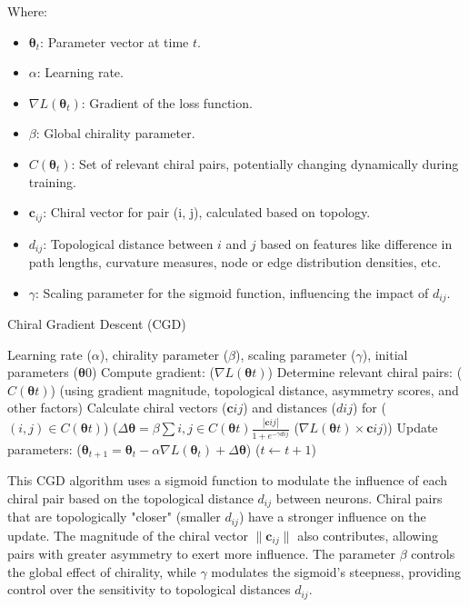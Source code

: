 \documentclass[12pt, a4paper]{article}
\begin{document}
Where:

\begin{itemize}
    \item \(\boldsymbol{\theta}_t\): Parameter vector at time \(t\).
    \item \(\alpha\): Learning rate.
    \item \(\nabla L(\boldsymbol{\theta}_t)\): Gradient of the loss function.
    \item \(\beta\): Global chirality parameter.
    \item \(C(\boldsymbol{\theta}_t)\): Set of relevant chiral pairs, potentially changing dynamically during training.
    \item \(\mathbf{c}_{ij}\): Chiral vector for pair (i, j), calculated based on topology.
    \item \(d_{ij}\): Topological distance between \(i\) and \(j\) based on features like difference in path lengths, curvature measures, node or edge distribution densities, etc.
    \item \(\gamma\): Scaling parameter for the sigmoid function, influencing the impact of \(d_{ij}\).
\end{itemize}

\begin{algorithm}
\caption{Chiral Gradient Descent (CGD)}
\label{alg:cgd}
\begin{algorithmic}
\Require Learning rate ($\alpha$), chirality parameter ($\beta$), scaling parameter ($\gamma$), initial parameters ($\boldsymbol{\theta}0$)
	\State Compute gradient: ($\nabla L(\boldsymbol{\theta}t)$)
	\State Determine relevant chiral pairs: ($C(\boldsymbol{\theta}t)$) (using gradient magnitude, topological distance, asymmetry scores, and other factors)
	\State Calculate chiral vectors ($\mathbf{c}{ij}$) and distances ($d{ij}$) for ($(i, j) \in C(\boldsymbol{\theta}t)$)
	\State ($\Delta \boldsymbol{\theta} = \beta \sum{i,j \in C(\boldsymbol{\theta}t)} \frac{| \mathbf{c}{ij} |}{1 + e^{-\gamma d{ij}}}$ ($\nabla L(\boldsymbol{\theta}t) \times \mathbf{c}{ij})$)
	\State Update parameters: ($\boldsymbol{\theta}_{t+1} = \boldsymbol{\theta}_t - \alpha \nabla L(\boldsymbol{\theta}_t) + \Delta \boldsymbol{\theta}$)
	\State ($t \gets t + 1$)
\EndWhile
\end{algorithmic}
\end{algorithm}


This CGD algorithm uses a sigmoid function to modulate the influence of each chiral pair based on the topological distance \(d_{ij}\) between neurons. Chiral pairs that are topologically "closer" (smaller \(d_{ij}\)) have a stronger influence on the update. The magnitude of the chiral vector \(\| \mathbf{c}_{ij} \|\) also contributes, allowing pairs with greater asymmetry to exert more influence. The parameter \(\beta\) controls the global effect of chirality, while \(\gamma\) modulates the sigmoid's steepness, providing control over the sensitivity to topological distances \(d_{ij}\).
\end{document}
